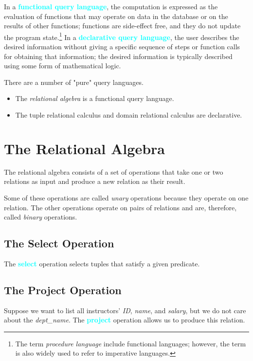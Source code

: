 \documentclass{Beautybook-EN}
\newcommand{\textcy}[1]{\textbf{\textcolor{cyan}{#1}}}
\begin{document}
In a \textcy{functional query language}, the computation is expressed as the evaluation of functions that may operate on data in the database or on the results of other functions; functions are side-effect free, and they do not update the program state.\footnote{The term \textit{procedure language} include functional languages; however, the term is also widely used to refer to imperative languages.} In a \textcy{declarative query language}, the user describes the desired information without giving a specific sequence of steps or function calls for obtaining that information; the desired information is typically described using some form of mathematical logic.

There are a number of "pure" query languages.
\begin{itemize}
    \item The \textit{relational algebra} is a functional query language.
    \item The tuple relational calculus and domain relational calculus are declarative.
\end{itemize}

\section{The Relational Algebra}

The relational algebra consists of a set of operations that take one or two relations as input and produce a new relation as their result.

Some of these operations are called \textit{unary} operations because they operate on one relation. The other operations operate on pairs of relations and are, therefore, called \textit{binary} operations.

\subsection{The Select Operation}

The \textcy{select} operation selects tuples that satisfy a given predicate.

\subsection{The Project Operation}

Suppose we want to list all instructors' \textit{ID}, \textit{name}, and \textit{salary}, but we do not care about the \textit{dept\_name}. The \textcy{project} operation allows us to produce this relation.
\end{document}
